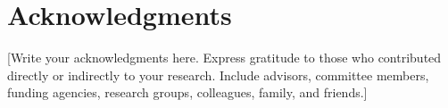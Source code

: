 
\chapter*{Acknowledgments}

[Write your acknowledgments here. Express gratitude to those who contributed directly or indirectly to your research. Include advisors, committee members, funding agencies, research groups, colleagues, family, and friends.]

